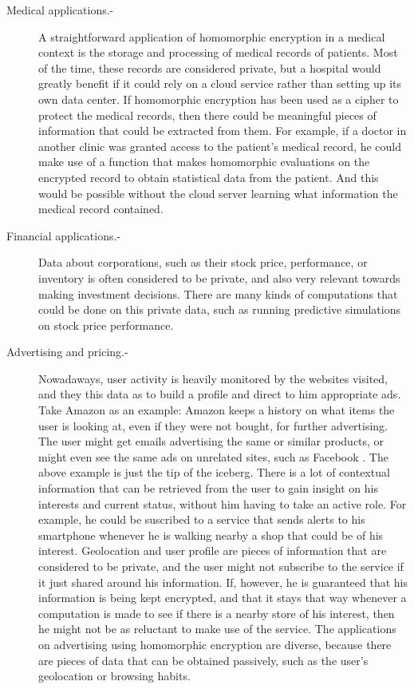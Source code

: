 \begin{description}
\item[Medical applications.-] A straightforward application of homomorphic encryption in a medical context is the storage and processing of medical records of patients. Most of the time, these records are considered private, but a hospital would greatly benefit if it could rely on a cloud service rather than setting up its own data center. If homomorphic encryption has been used as a cipher to protect the medical records, then there could be meaningful pieces of information that could be extracted from them. For example, if a doctor in another clinic was granted access to the patient's medical record, he could make use of a function that makes homomorphic evaluations on the encrypted record to obtain statistical data from the patient. And this would be possible without the cloud server learning what information the medical record contained.
\item[Financial applications.-] Data about corporations, such as their stock price, performance, or inventory is often considered to be private, and also very relevant towards making investment decisions. There are many kinds of computations that could be done on this private data, such as running predictive simulations on stock price performance. 
\item[Advertising and pricing.-] Nowadaways, user activity is heavily monitored by the websites visited, and they this data as to build a profile and direct to him appropriate ads. Take Amazon as an example: Amazon keeps a history on what items the user is looking at, even if they were not bought, for further advertising. The user might get emails advertising the same or similar products, or might even see the same ads on unrelated sites, such as Facebook \cite{KimMai}. 
  The above example is just the tip of the iceberg. There is a lot of contextual information that can be retrieved from the user to gain insight on his interests and current status, without him having to take an active role. For example, he could be suscribed to a service that sends alerts to his smartphone whenever he is walking nearby a shop that could be of his interest. Geolocation and user profile are pieces of information that are considered to be private, and the user might not subscribe to the service if it just shared around his information. If, however, he is guaranteed that his information is being kept encrypted, and that it stays that way whenever a computation is made to see if there is a nearby store of his interest, then he might not be as reluctant to make use of the service. The applications on advertising using homomorphic encryption are diverse, because there are pieces of data that can be obtained passively, such as the user's geolocation or browsing habits.

\end{description}
